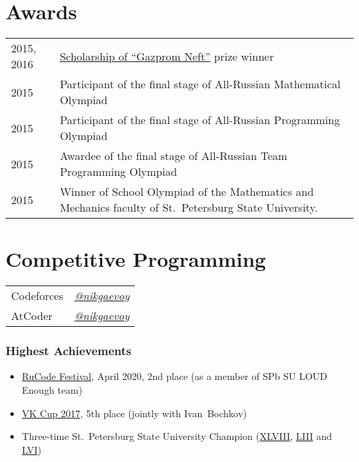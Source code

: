 \documentclass[a4paper, 11pt]{article}
\begin{document}
\section*{Awards}

\begin{tabularx}{\textwidth}{lX}
    2015, 2016 & \href{https://math-cs.spbu.ru/en/scholarships-rodnye-goroda/}{Scholarship of ``Gazprom Neft''} prize winner \\

    2015 & Participant of the final stage of All-Russian Mathematical Olympiad \\
    
    2015 & Participant of the final stage of All-Russian Programming Olympiad \\
    
    2015 & Awardee of the final stage of All-Russian Team Programming Olympiad \\

    2015 & Winner of School Olympiad of the Mathematics and Mechanics faculty of St.~Petersburg State University.
\end{tabularx}

\section*{Competitive Programming}

\begin{tabular}{ll}
    Codeforces & \href{https://codeforces.com/profile/nikgaevoy}{{\it @nikgaevoy}} \\
    AtCoder & \href{https://atcoder.jp/users/nikgaevoy}{{\it @nikgaevoy}}
\end{tabular}

\subsubsection*{Highest Achievements}

\begin{itemize}
    \item \href{http://rucode.it-edu.mipt.ru/rucode2020resAB}{RuCode Festival}, April 2020, 2nd place (as a member of SPb SU LOUD Enough team)
    
    \item \href{https://codeforces.com/blog/entry/53192}{VK Cup 2017}, 5th place (jointly with Ivan~Bochkov)
    
    \item Three-time St.~Petersburg State University Champion (\href{https://acm.math.spbu.ru/cgi-bin/monitor.pl/n171015.dat}{XLVIII}, \href{https://acm.math.spbu.ru/cgi-bin/monitor.pl/n190421.dat}{LIII} and \href{https://acm.math.spbu.ru/cgi-bin/monitor.pl/n201206.dat}{LVI})
\end{itemize}
\end{document}
